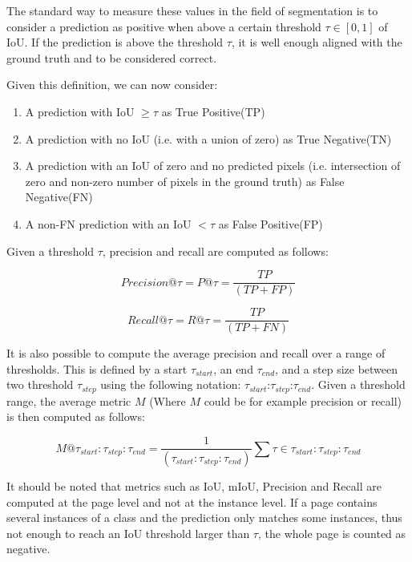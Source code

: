 \documentclass[oneside, english, bibtex]{kththesis}
\begin{document}
The standard way to measure these values in the field of segmentation is to consider a prediction as positive when above a certain threshold $\tau \in [0,1]$ of IoU. If the prediction is above the threshold $\tau$, it is well enough aligned with the ground truth and to be considered correct.

Given this definition, we can now consider:
\begin{enumerate}
\item A prediction with IoU $\geq \tau$ as True Positive(TP)
\item A prediction with no IoU (i.e. with a union of zero) as True Negative(TN)
\item A prediction with an IoU of zero and no predicted pixels (i.e. intersection of zero and non-zero number of pixels in the ground truth) as False Negative(FN)
\item A non-FN prediction with an IoU $< \tau$ as False Positive(FP)
\end{enumerate}

Given a threshold $\tau$, precision and recall are computed as follows:

\begin{equation}
	Precision @ \tau = P@\tau = \frac{TP}{(TP + FP)}
  	\label{eqn:precision}
\end{equation}

\begin{equation}
	Recall @ \tau = R@\tau = \frac{TP}{(TP + FN)}
  	\label{eqn:recall}
\end{equation}

It is also possible to compute the average precision and recall over a range of thresholds. This is defined by a start $\tau_{start}$, an end $\tau_{end}$, and a step size between two threshold $\tau_{step}$ using the following notation: $\tau_{start}$:$\tau_{step}$:$\tau_{end}$. Given a threshold range, the average metric $M$ (Where $M$ could be for example precision or recall) is then computed as follows:

\begin{equation}
M@\tau_{start}:\tau_{step}:\tau_{end} = \frac{1}{(\tau_{start}:\tau_{step}:\tau_{end})} \sum{} \tau \in \tau_{start}:\tau_{step}:\tau_{end}
    \label{eqn:rangem}
\end{equation}

It should be noted that metrics such as IoU, mIoU, Precision and Recall are computed at the page level and not at the instance level. If a page contains several instances of a class and the prediction only matches some instances, thus not enough to reach an IoU threshold larger than $\tau$, the whole page is counted as negative.
\end{document}
